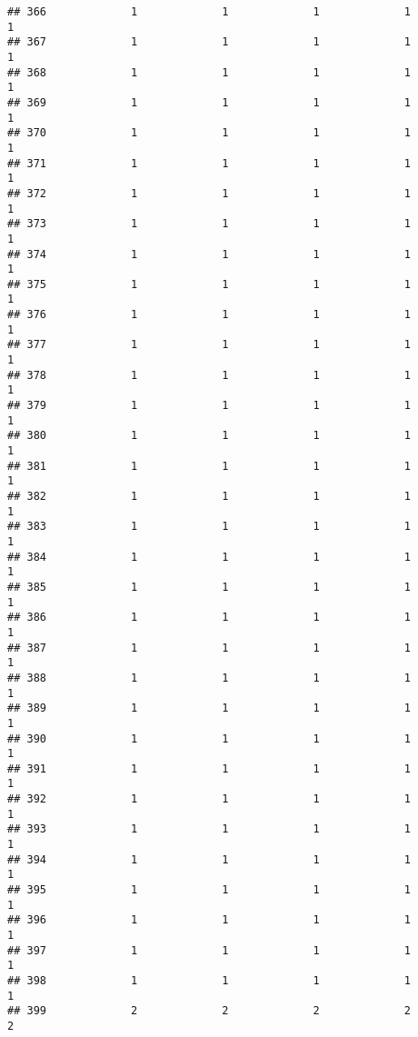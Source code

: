 \documentclass[
]{article}
\begin{document}
\begin{verbatim}
## 366             1             1             1             1             1
## 367             1             1             1             1             1
## 368             1             1             1             1             1
## 369             1             1             1             1             1
## 370             1             1             1             1             1
## 371             1             1             1             1             1
## 372             1             1             1             1             1
## 373             1             1             1             1             1
## 374             1             1             1             1             1
## 375             1             1             1             1             1
## 376             1             1             1             1             1
## 377             1             1             1             1             1
## 378             1             1             1             1             1
## 379             1             1             1             1             1
## 380             1             1             1             1             1
## 381             1             1             1             1             1
## 382             1             1             1             1             1
## 383             1             1             1             1             1
## 384             1             1             1             1             1
## 385             1             1             1             1             1
## 386             1             1             1             1             1
## 387             1             1             1             1             1
## 388             1             1             1             1             1
## 389             1             1             1             1             1
## 390             1             1             1             1             1
## 391             1             1             1             1             1
## 392             1             1             1             1             1
## 393             1             1             1             1             1
## 394             1             1             1             1             1
## 395             1             1             1             1             1
## 396             1             1             1             1             1
## 397             1             1             1             1             1
## 398             1             1             1             1             1
## 399             2             2             2             2             2

\end{verbatim}
\end{document}
